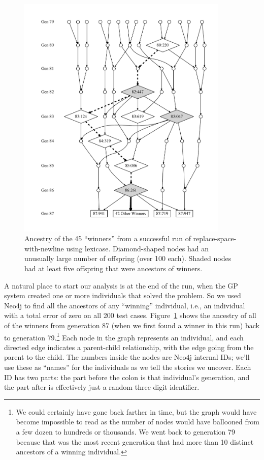 \begin{figure}[tp]
	\begin{center}
	\includegraphics[width=0.9\textwidth]{figures/ancestors_of_winners_colons.pdf}
	\end{center}
	\caption{Ancestry of the 45 ``winners'' from a successful run of replace-space-with-newline using
		lexicase. Diamond-shaped nodes
		had an unusually large number of offspring (over 100 each). Shaded nodes
		had at least five offspring that were ancestors of winners.}
	\label{fig:winnerAncestors}
\end{figure}

A natural place to start our analysis is at the end of the run, when the GP system created one or more individuals that 
solved the problem. So we used Neo4j to find all the ancestors of any ``winning'' individual, i.e., an individual 
with a total error of zero
on all 200 test cases.
Figure~\ref{fig:winnerAncestors} shows the ancestry of all of the winners from generation 87 
(when we first found a winner in this run) back to generation 79.\footnote{We could certainly 
	have gone back farther in time, but the graph would have become impossible to read as the
	number of nodes would have ballooned from a few dozen to hundreds or thousands. We went
	back to generation 79 because that was the most recent generation that had more than 10
	distinct ancestors of a winning individual.}
Each node in the graph represents an individual, and each directed edge indicates a parent-child
relationship, with the edge going from the parent to the child. The numbers inside the nodes are
Neo4j internal IDs; we'll use these as ``names'' for the individuals as we tell the stories 
we uncover. Each ID has two parts:
the part before the colon is that individual's generation, and the part after is effectively
just a random three digit identifier.

